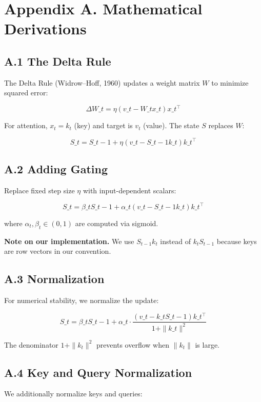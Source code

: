 
\section{Appendix A. Mathematical Derivations}

\subsection{A.1 The Delta Rule}

The Delta Rule (Widrow--Hoff, 1960) updates a weight matrix $W$ to 
minimize squared error:

\[
\Delta W\_t = \eta (v\_t - W\_t x\_t) x\_t^\top
\tag{A.1}
\]

For attention, $x_t = k_t$ (key) and target is $v_t$ (value). The state 
$S$ replaces $W$:

\[
S\_t = S\_{t-1} + \eta (v\_t - S\_{t-1} k\_t) k\_t^\top
\tag{A.2}
\]

\subsection{A.2 Adding Gating}

Replace fixed step size $\eta$ with input-dependent scalars:

\[
S\_t = \beta\_t S\_{t-1} + \alpha\_t (v\_t - S\_{t-1} k\_t) k\_t^\top
\tag{A.3}
\]

where $\alpha_t, \beta_t \in (0, 1)$ are computed via sigmoid.

\textbf{Note on our implementation.} We use $S_{t-1} k_t$ instead of $k_t S_{t-1}$ 
because keys are row vectors in our convention.

\subsection{A.3 Normalization}

For numerical stability, we normalize the update:

\[
S\_t = \beta\_t S\_{t-1} + \alpha\_t \cdot \frac{(v\_t - k\_t S\_{t-1}) k\_t^\top}{1 + \|k\_t\|^2}
\tag{A.4}
\]

The denominator $1 + \|k_t\|^2$ prevents overflow when $\|k_t\|$ is large.

\subsection{A.4 Key and Query Normalization}

We additionally normalize keys and queries:


